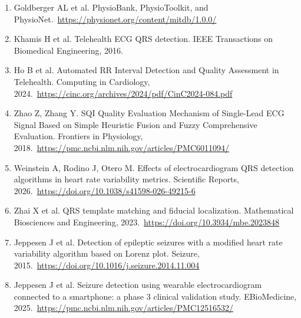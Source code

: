 \documentclass[10pt]{article}
\begin{document}
\begin{enumerate}
\item Goldberger AL et al. PhysioBank, PhysioToolkit, and PhysioNet.\
      \url{https://physionet.org/content/mitdb/1.0.0/}
\item Khamis H et al. Telehealth ECG QRS detection. IEEE Transactions on Biomedical Engineering, 2016.
\item Ho B et al. Automated RR Interval Detection and Quality Assessment in Telehealth. Computing in Cardiology, 2024.\
      \url{https://cinc.org/archives/2024/pdf/CinC2024-084.pdf}
\item Zhao Z, Zhang Y. SQI Quality Evaluation Mechanism of Single-Lead ECG Signal Based on Simple Heuristic Fusion and Fuzzy Comprehensive Evaluation. Frontiers in Physiology, 2018.\
      \url{https://pmc.ncbi.nlm.nih.gov/articles/PMC6011094/}
\item Weinstein A, Rodino J, Otero M. Effects of electrocardiogram QRS detection algorithms in heart rate variability metrics. Scientific Reports, 2026.\
      \url{https://doi.org/10.1038/s41598-026-49215-6}
\item Zhai X et al. QRS template matching and fiducial localization. Mathematical Biosciences and Engineering, 2023.\
      \url{https://doi.org/10.3934/mbe.2023848}
\item Jeppesen J et al. Detection of epileptic seizures with a modified heart rate variability algorithm based on Lorenz plot. Seizure, 2015.\
      \url{https://doi.org/10.1016/j.seizure.2014.11.004}
\item Jeppesen J et al. Seizure detection using wearable electrocardiogram connected to a smartphone: a phase 3 clinical validation study. EBioMedicine, 2025.\
      \url{https://pmc.ncbi.nlm.nih.gov/articles/PMC12516532/}
\end{enumerate}
\end{document}
